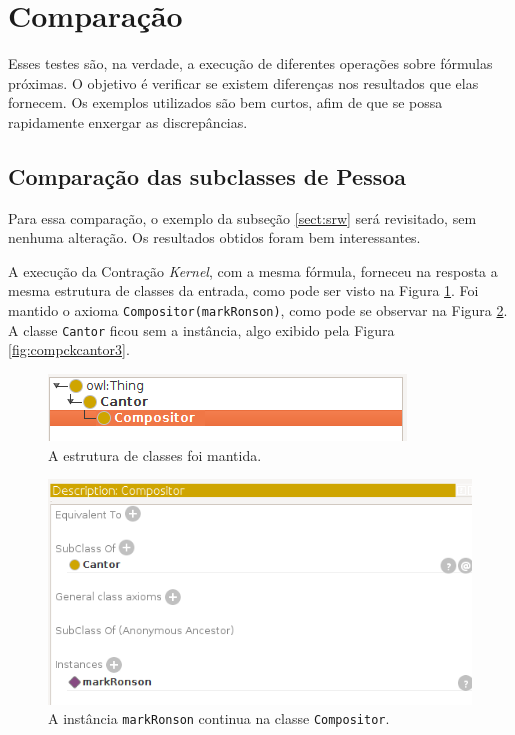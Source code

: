 \section{Comparação}

Esses testes são, na verdade, a execução de diferentes operações sobre fórmulas próximas. O objetivo é verificar se existem diferenças nos resultados que elas fornecem. Os exemplos utilizados são bem curtos, afim de que se possa rapidamente enxergar as discrepâncias.

\subsection{Comparação das subclasses de Pessoa}

Para essa comparação, o exemplo da subseção \ref{sect:srw} será revisitado, sem nenhuma alteração. Os resultados obtidos foram bem interessantes.

A execução da Contração \textit{Kernel}, com a mesma fórmula, forneceu na resposta a mesma estrutura de classes da entrada, como pode ser visto na Figura \ref{fig:compckcantor1}. Foi mantido o axioma \texttt{Compositor(markRonson)}, como pode se observar na Figura \ref{fig:compckcantor2}. A classe \texttt{Cantor} ficou sem a instância, algo exibido pela Figura \ref{fig:compckcantor3}.

\begin{figure}[H]
	\centering
	\includegraphics[width=0.5\linewidth]{Capitulos/Testes/compckcantor1}
	\caption{A estrutura de classes foi mantida.}
	\label{fig:compckcantor1}
\end{figure}

\begin{figure}[H]
	\centering
	\includegraphics[width=0.5\linewidth]{Capitulos/Testes/compckcantor2}
	\caption{A instância \texttt{markRonson} continua na classe \texttt{Compositor}.}
	\label{fig:compckcantor2}
\end{figure}


